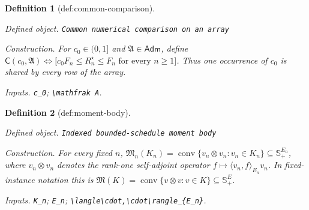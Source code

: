 \documentclass{article}
\newtheorem{definition}{Definition}
\begin{document}
\begin{definition}[def:common-comparison]\label{def:common-comparison}
\par\smallskip\noindent\emph{Defined object.} \texttt{Common numerical comparison on an array}
\par\smallskip\noindent\emph{Construction.} For \(c_0\in(0,1]\) and \(\mathfrak A\in\mathsf{Adm}\), define \(\mathsf C(c_0,\mathfrak A)\Longleftrightarrow\bigl[c_0F_n\le R_n^{\star}\le F_n\text{ for every }n\ge1\bigr]\). Thus one occurrence of \(c_0\) is shared by every row of the array.
\par\smallskip\noindent\emph{Inputs.} \texttt{c\_\allowbreak{}0}; \texttt{\textbackslash{}\allowbreak{}mathfrak A}.
\end{definition}

\begin{definition}[def:moment-body]\label{def:moment-body}
\par\smallskip\noindent\emph{Defined object.} \texttt{Indexed bounded-\allowbreak{}schedule moment body}
\par\smallskip\noindent\emph{Construction.} For every fixed \(n\), \(\mathfrak M_n(K_n)=\operatorname{conv}\{v_n\otimes v_n:v_n\in K_n\}\subseteq\mathbb S_+^{E_n}\), where \(v_n\otimes v_n\) denotes the rank-one self-adjoint operator \(f\mapsto\langle v_n,f\rangle_{E_n}v_n\). In fixed-instance notation this is \(\mathfrak M(K)=\operatorname{conv}\{v\otimes v:v\in K\}\subseteq\mathbb S_+^E\).
\par\smallskip\noindent\emph{Inputs.} \texttt{K\_\allowbreak{}n}; \texttt{E\_\allowbreak{}n}; \texttt{\textbackslash{}\allowbreak{}langle\textbackslash{}\allowbreak{}cdot,\allowbreak{}\textbackslash{}\allowbreak{}cdot\textbackslash{}\allowbreak{}rangle\_\allowbreak{}\{E\_\allowbreak{}n\}\allowbreak{}}.
\end{definition}
\end{document}

